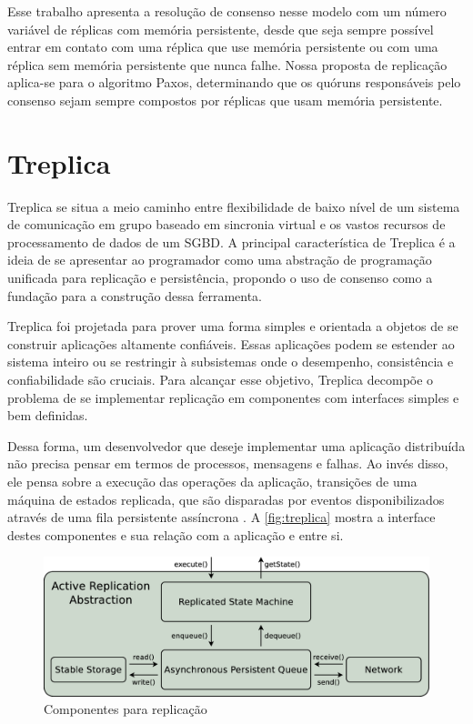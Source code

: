 Esse trabalho apresenta a resolução de consenso nesse modelo com um número variável de
réplicas com memória persistente, desde que seja sempre possível entrar em contato com
uma réplica que use memória persistente ou com uma réplica sem memória persistente que
nunca falhe. Nossa proposta de replicação aplica-se para o algoritmo Paxos, determinando
que os quóruns responsáveis pelo consenso sejam sempre compostos por réplicas que usam
memória persistente.


\section{Treplica}\label{sec:treplica}

Treplica se situa a meio caminho entre flexibilidade de baixo nível de um sistema de
comunicação em grupo \cite{birman93} baseado em sincronia virtual \cite{birman05,
friedman96} e os vastos recursos de processamento de dados de um SGBD. A principal
característica de Treplica é a ideia de se apresentar ao programador como uma abstração de
programação unificada para replicação e persistência, propondo o uso de consenso
\cite{barborak93} como a fundação para a construção dessa ferramenta.

Treplica foi projetada para prover uma forma simples e orientada a objetos de se construir
aplicações altamente confiáveis. Essas aplicações podem se estender ao sistema inteiro ou
se restringir à subsistemas onde o desempenho, consistência e confiabilidade são cruciais.
Para alcançar esse objetivo, Treplica decompõe o problema de se implementar replicação em
componentes com interfaces simples e bem definidas.

Dessa forma, um desenvolvedor que deseje implementar uma aplicação distribuída não precisa
pensar em termos de processos, mensagens e falhas. Ao invés disso, ele pensa sobre a
execução das operações da aplicação, transições de uma máquina de estados replicada, que
são disparadas por eventos disponibilizados através de uma fila persistente assíncrona
\cite{vieira-tr10b}. A \autoref{fig:treplica} mostra a interface destes componentes e sua
relação com a aplicação e entre si.

\begin{figure}[ht]
  \begin{center}
    \includegraphics[width=14cm]{conteudo/capitulos/figuras/treplica.eps}
  \end{center}
  \caption{Componentes para replicação}
  \label{fig:treplica}
\end{figure}

